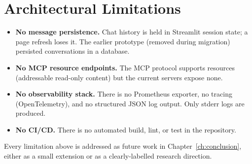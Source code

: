 \section{Architectural Limitations}
\label{sec:lim-arch}

\begin{itemize}[leftmargin=1.4em]
  \item \textbf{No message persistence.} Chat history is held in
        Streamlit session state; a page refresh loses it. The
        earlier prototype (removed during migration) persisted
        conversations in a database.
  \item \textbf{No MCP resource endpoints.} The MCP protocol
        supports resources (addressable read-only content) but the
        current servers expose none.
  \item \textbf{No observability stack.} There is no Prometheus
        exporter, no tracing (OpenTelemetry), and no structured
        JSON log output. Only stderr logs are produced.
  \item \textbf{No CI/CD.} There is no automated build, lint, or
        test in the repository.
\end{itemize}

Every limitation above is addressed as future work in
Chapter~\ref{ch:conclusion}, either as a small extension or as a
clearly-labelled research direction.
